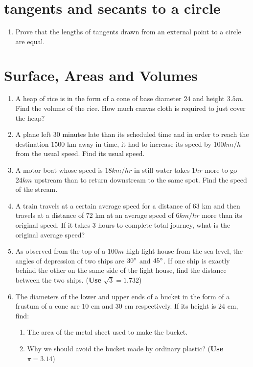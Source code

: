 \documentclass{article}
\begin{document}
\section{tangents and secants to a circle}
\begin{enumerate}[label=(\roman*)]
	\item Prove that the lengths of tangents drawn from an external point to a circle are equal.
\end{enumerate}
\section{Surface, Areas and Volumes}
\begin{enumerate}[label=(\roman*)]
	\item A heap of rice is in the form of a cone of base diameter $24$ and height $3.5 m$. Find the volume of the rice. How much canvas cloth is required to just cover the heap?
	\item A plane left $30$ minutes late than its scheduled time and in order to reach the destination $1500$ km away in time, it had to increase  its speed by $100 km/h$ from the usual speed. Find its usual speed.
	\item A motor boat whose speed is $18  km/hr$ in still water takes $1hr$ more to go $24 km$ upstream than to return downstream to the same spot. Find the speed of the stream.
		\item A train travels at a certain average speed for a distance of $63$ km and then travels at a distance of $72$ km at an average speed of $6 km/hr$ more than its original speed. If it takes $3$ hours to complete total journey, what is the original average speed?
		\item As observed from the top of a $100 m$ high light house from the sea level, the angles of depression of two ships are $30\degree$ and $45\degree$. If one ship is exactly behind the other on the same side of the light house, find the distance between the two ships. ({\textbf{Use}} $\sqrt3 = 1.732$)
		\item The diameters of the lower and upper ends of a bucket in the form of a frustum of a cone are $10$ cm and $30$ cm respectively. If its height is $24$ cm, find:
			\begin{enumerate}[label=(\roman*)]
				\item The area of the metal sheet used to make the bucket.
				\item Why we should avoid the bucket made by ordinary plastic? ({\textbf{Use}} $\pi = 3.14 $)
\end{enumerate}
\end{enumerate}
\end{document}
